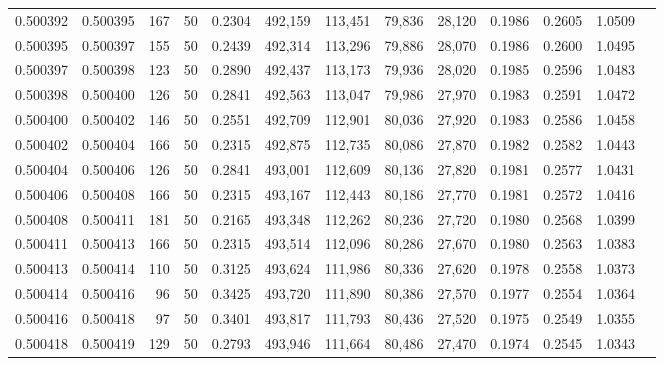 \begin{tabular}{rrrrrrrrrrrrr}
0.500392 & 0.500395 & 167 &  50 &                                     0.2304 & 492,159 & 113,451 &  79,836 &  28,120 & 0.1986 & 0.2605 & 1.0509 \\
0.500395 & 0.500397 & 155 &  50 &                                     0.2439 & 492,314 & 113,296 &  79,886 &  28,070 & 0.1986 & 0.2600 & 1.0495 \\
0.500397 & 0.500398 & 123 &  50 &                                     0.2890 & 492,437 & 113,173 &  79,936 &  28,020 & 0.1985 & 0.2596 & 1.0483 \\
0.500398 & 0.500400 & 126 &  50 &                                     0.2841 & 492,563 & 113,047 &  79,986 &  27,970 & 0.1983 & 0.2591 & 1.0472 \\
0.500400 & 0.500402 & 146 &  50 &                                     0.2551 & 492,709 & 112,901 &  80,036 &  27,920 & 0.1983 & 0.2586 & 1.0458 \\
0.500402 & 0.500404 & 166 &  50 &                                     0.2315 & 492,875 & 112,735 &  80,086 &  27,870 & 0.1982 & 0.2582 & 1.0443 \\
0.500404 & 0.500406 & 126 &  50 &                                     0.2841 & 493,001 & 112,609 &  80,136 &  27,820 & 0.1981 & 0.2577 & 1.0431 \\
0.500406 & 0.500408 & 166 &  50 &                                     0.2315 & 493,167 & 112,443 &  80,186 &  27,770 & 0.1981 & 0.2572 & 1.0416 \\
0.500408 & 0.500411 & 181 &  50 &                                     0.2165 & 493,348 & 112,262 &  80,236 &  27,720 & 0.1980 & 0.2568 & 1.0399 \\
0.500411 & 0.500413 & 166 &  50 &                                     0.2315 & 493,514 & 112,096 &  80,286 &  27,670 & 0.1980 & 0.2563 & 1.0383 \\
0.500413 & 0.500414 & 110 &  50 &                                     0.3125 & 493,624 & 111,986 &  80,336 &  27,620 & 0.1978 & 0.2558 & 1.0373 \\
0.500414 & 0.500416 &  96 &  50 &                                     0.3425 & 493,720 & 111,890 &  80,386 &  27,570 & 0.1977 & 0.2554 & 1.0364 \\
0.500416 & 0.500418 &  97 &  50 &                                     0.3401 & 493,817 & 111,793 &  80,436 &  27,520 & 0.1975 & 0.2549 & 1.0355 \\
0.500418 & 0.500419 & 129 &  50 &                                     0.2793 & 493,946 & 111,664 &  80,486 &  27,470 & 0.1974 & 0.2545 & 1.0343 \\

\end{tabular}
